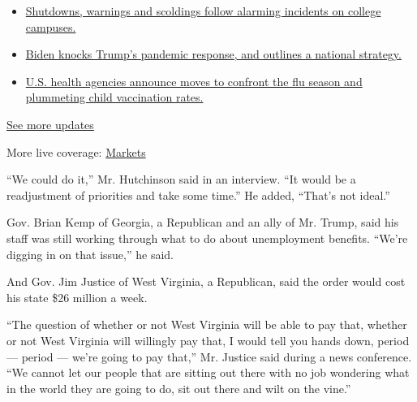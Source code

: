 \begin{itemize}
\tightlist
\item
  \href{https://www.nytimes3xbfgragh.onion/2020/08/20/world/coronavirus-covid.html?action=click\&pgtype=Article\&state=default\&region=MAIN_CONTENT_1\&context=storylines_live_updates\#link-68774d88}{Shutdowns,
  warnings and scoldings follow alarming incidents on college campuses.}
\item
  \href{https://www.nytimes3xbfgragh.onion/2020/08/20/world/coronavirus-covid.html?action=click\&pgtype=Article\&state=default\&region=MAIN_CONTENT_1\&context=storylines_live_updates\#link-26b58724}{Biden
  knocks Trump's pandemic response, and outlines a national strategy.}
\item
  \href{https://www.nytimes3xbfgragh.onion/2020/08/20/world/coronavirus-covid.html?action=click\&pgtype=Article\&state=default\&region=MAIN_CONTENT_1\&context=storylines_live_updates\#link-4e542da3}{U.S.
  health agencies announce moves to confront the flu season and
  plummeting child vaccination rates.}
\end{itemize}

\href{https://www.nytimes3xbfgragh.onion/2020/08/20/world/coronavirus-covid.html?action=click\&pgtype=Article\&state=default\&region=MAIN_CONTENT_1\&context=storylines_live_updates}{See
more updates}

More live coverage:
\href{https://www.nytimes3xbfgragh.onion/live/2020/08/20/business/stock-market-today-coronavirus?action=click\&pgtype=Article\&state=default\&region=MAIN_CONTENT_1\&context=storylines_live_updates}{Markets}

``We could do it,'' Mr. Hutchinson said in an interview. ``It would be a
readjustment of priorities and take some time.'' He added, ``That's not
ideal.''

Gov. Brian Kemp of Georgia, a Republican and an ally of Mr. Trump, said
his staff was still working through what to do about unemployment
benefits. ``We're digging in on that issue,'' he said.

And Gov. Jim Justice of West Virginia, a Republican, said the order
would cost his state \$26 million a week.

``The question of whether or not West Virginia will be able to pay that,
whether or not West Virginia will willingly pay that, I would tell you
hands down, period --- period --- we're going to pay that,'' Mr. Justice
said during a news conference. ``We cannot let our people that are
sitting out there with no job wondering what in the world they are going
to do, sit out there and wilt on the vine.''

